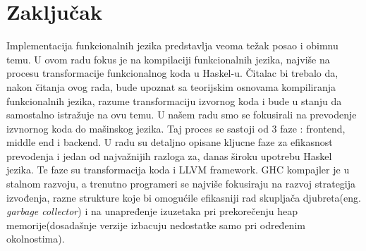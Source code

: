 \section{Zaključak}
\label{sec:zakljucak}

Implementacija funkcionalnih jezika predstavlja veoma težak posao i obimnu temu. U ovom radu fokus je na kompilaciji funkcionalnih jezika, najviše na procesu transformacije funkcionalnog koda u Haskel-u. Čitalac bi trebalo da, nakon čitanja ovog rada, bude upoznat sa teorijskim osnovama kompiliranja funkcionalnih jezika, razume transformaciju izvornog koda i bude u stanju da samostalno istražuje na ovu temu.
U našem radu smo se fokusirali na prevodenje izvnornog koda do mašinskog jezika. Taj proces se sastoji od 3 faze : frontend, middle end i backend. U radu su detaljno opisane kljucne faze za efikasnost prevodenja i jedan od najvažnijih razloga za, danas široku upotrebu Haskel jezika. Te faze su transformacija koda i LLVM framework.
GHC kompajler je u stalnom razvoju, a trenutno programeri se najviše fokusiraju na razvoj strategija izvođenja, razne strukture koje bi omogućile efikasniji rad skupljača djubreta(eng. \emph{garbage collector}) i na unapređenje izuzetaka pri prekorečenju heap memorije(dosadašnje verzije izbacuju nedostatke samo pri određenim okolnostima).
